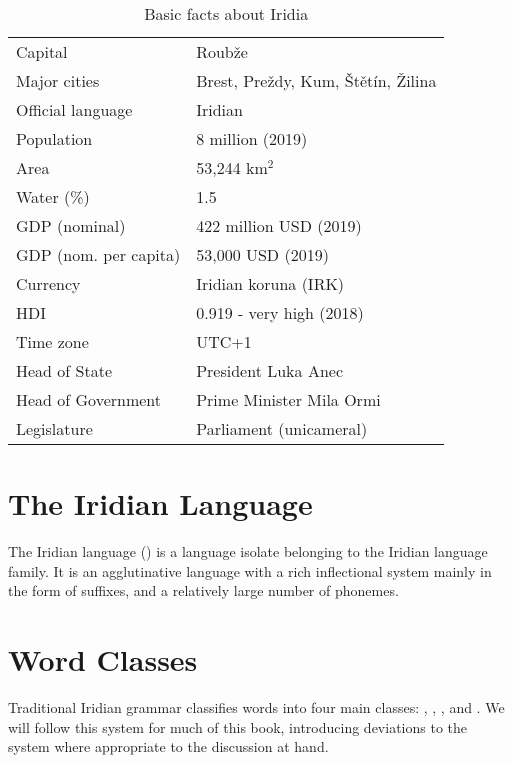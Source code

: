 \begin{table}
\centering \begin{tabular}{ll} \hline
Capital & Roubže \\
Major cities & Brest, Preždy, Kum, Štětín, Žilina \\
Official language & Iridian \\
Population & 8 million (2019) \\
Area & 53,244 km$^2$ \\
Water (\%) & 1.5 \\
GDP (nominal) & 422 million USD (2019) \\
GDP (nom. per capita) & 53,000 USD (2019) \\
Currency & Iridian koruna (IRK) \\
HDI & 0.919 - very high (2018) \\
Time zone & UTC+1 \\
Head of State & President Luka Anec \\
Head of Government & Prime Minister Mila Ormi \\
Legislature & Parliament (unicameral)\\
\hline
\end{tabular}
\caption{Basic facts about Iridia}
\label{tab:fact-sheet}
\end{table}


\section{The Iridian Language}

The Iridian language () is a language isolate belonging to the Iridian language family. It is an agglutinative language with a rich inflectional system mainly in the form of suffixes, and a relatively large number of phonemes.


\section{Word Classes}\label{sec:wordclasses}
Traditional Iridian grammar classifies words into four main classes: , , , and . We will follow this system for much of this book, introducing deviations to the system where appropriate to the discussion at hand.

